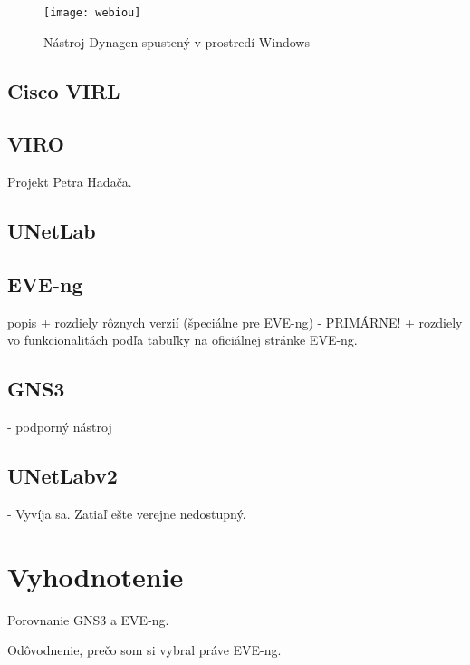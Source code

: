 \begin{figure}
    \centering
    \texttt{[image: webiou]}
    \caption{Nástroj Dynagen spustený v prostredí Windows} \cite{obr_webiou}
    \label{obr:webiou}
\end{figure}

\subsection{Cisco VIRL}

\subsection{VIRO}

Projekt Petra Hadača.

\subsection{UNetLab}

\subsection{EVE-ng}

popis + rozdiely rôznych verzií (špeciálne pre EVE-ng) - PRIMÁRNE! + rozdiely vo funkcionalitách podľa tabuľky na oficiálnej stránke EVE-ng.

\subsection{GNS3}

- podporný nástroj

\subsection{UNetLabv2}

- Vyvíja sa. Zatiaľ ešte verejne nedostupný.

\section{Vyhodnotenie}

Porovnanie GNS3 a EVE-ng.

Odôvodnenie, prečo som si vybral práve EVE-ng.